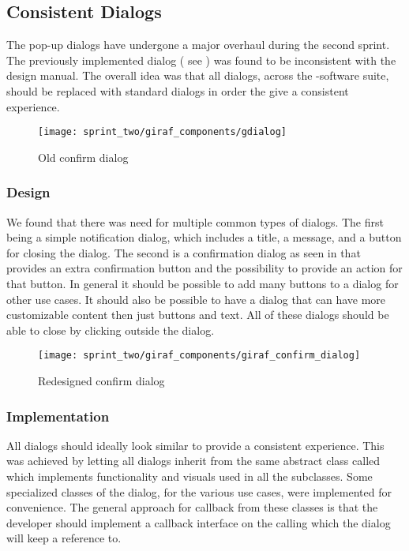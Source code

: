 \subsection{Consistent Dialogs}
\label{sec:consistent_dialogs}

The pop-up dialogs have undergone a major overhaul during the second sprint. The previously implemented dialog ( see ) was found to be inconsistent with the \giraf design manual. The overall idea was that all dialogs, across the \giraf-software suite, should be replaced with standard dialogs in order the give a consistent experience. 

\begin{figure}[!htbp]
    \centering
    \texttt{[image: sprint\_two/giraf\_components/gdialog]}
    \caption{Old confirm dialog}
    \label{fig:gdialog}
\end{figure}

\subsubsection{Design}
We found that there was need for multiple common types of dialogs. The first being a simple notification dialog, which includes a title, a message, and a button for closing the dialog. The second is a confirmation dialog as seen in  that provides an extra confirmation button and the possibility to provide an action for that button. In general it should be possible to add many buttons to a dialog for other use cases. It should also be possible to have a dialog that can have more customizable content then just buttons and text. All of these dialogs should be able to close by clicking outside the dialog.

\begin{figure}[!htbp]
    \centering
    \texttt{[image: sprint\_two/giraf\_components/giraf\_confirm\_dialog]}
    \caption{Redesigned confirm dialog}
    \label{fig:giraf_confirm_dialog}
\end{figure}

\subsubsection{Implementation}

All dialogs should ideally look similar to provide a consistent experience. This was achieved by letting all dialogs inherit from the same abstract class called  which implements functionality and visuals used in all the subclasses. Some specialized classes of the dialog, for the various use cases, were implemented for convenience. The general approach for callback from these classes is that the developer should implement a callback interface on the calling  which the dialog will keep a reference to.